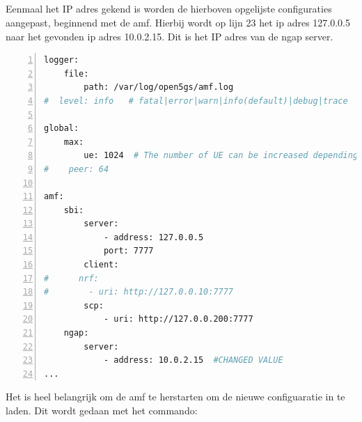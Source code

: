 \subsection{}%
\label{sec:open5gs_amf}%

Eenmaal het IP adres gekend is worden de hierboven opgelijste configuraties aangepast, beginnend met de \gls{amf}. Hierbij wordt op lijn 23 het ip adres 127.0.0.5 naar het gevonden ip adres 10.0.2.15. Dit is het IP  adres van de ngap server.

\begin{lstlisting}[basicstyle=\small, frame=single, breaklines=true, postbreak=\mbox{\textcolor{red}{$\hookrightarrow$}\space}, escapeinside ={\%,}, escapechar={!}, numbers=left, language=sh, caption=Open5GS amf configuratie]
logger:
    file:
        path: /var/log/open5gs/amf.log
#  level: info   # fatal|error|warn|info(default)|debug|trace

global:
    max:
        ue: 1024  # The number of UE can be increased depending on memory size.
#    peer: 64

amf:
    sbi:
        server:
            - address: 127.0.0.5
            port: 7777
        client:
#      nrf:
#        - uri: http://127.0.0.10:7777
        scp:
            - uri: http://127.0.0.200:7777
    ngap:
        server:
            - address: 10.0.2.15  #CHANGED VALUE
...
\end{lstlisting}

Het is heel belangrijk om de \gls{amf} te herstarten om de nieuwe configuaratie in te laden. Dit wordt gedaan met het commando: 

\subsection{}%
\label{sec:gnb_config}%

